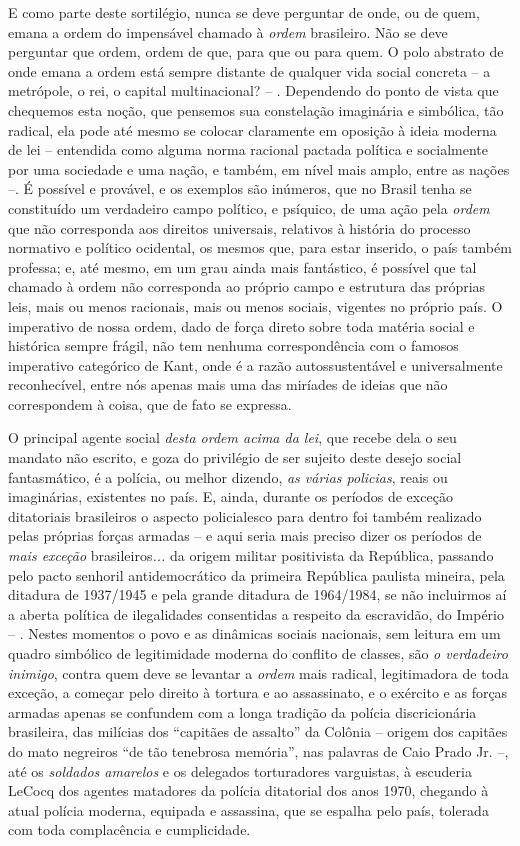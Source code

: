 E como parte deste sortilégio, nunca se deve perguntar de onde, ou de
quem, emana a ordem do impensável chamado à \emph{ordem} brasileiro. Não
se deve perguntar que ordem, ordem de que, para que ou para quem. O polo
abstrato de onde emana a ordem está sempre distante de qualquer vida
social concreta -- a metrópole, o rei, o capital multinacional? -- .
Dependendo do ponto de vista que chequemos esta noção, que pensemos sua
constelação imaginária e simbólica, tão radical, ela pode até mesmo se
colocar claramente em oposição à ideia moderna de lei -- entendida como
alguma norma racional pactada política e socialmente por uma sociedade e
uma nação, e também, em nível mais amplo, entre as nações --. É possível
e provável, e os exemplos são inúmeros, que no Brasil tenha se
constituído um verdadeiro campo político, e psíquico, de uma ação pela
\emph{ordem} que não corresponda aos direitos universais, relativos à
história do processo normativo e político ocidental, os mesmos que, para
estar inserido, o país também professa; e, até mesmo, em um grau ainda
mais fantástico, é possível que tal chamado à ordem não corresponda ao
próprio campo e estrutura das próprias leis, mais ou menos racionais,
mais ou menos sociais, vigentes no próprio país. O imperativo de nossa
ordem, dado de força direto sobre toda matéria social e histórica sempre
frágil, não tem nenhuma correspondência com o famosos imperativo
categórico de Kant, onde é a razão autossustentável e universalmente
reconhecível, entre nós apenas mais uma das miríades de ideias que não
correspondem à coisa, que de fato se expressa.

O principal agente social \emph{desta ordem acima da lei}, que recebe
dela o seu mandato não escrito, e goza do privilégio de ser sujeito
deste desejo social fantasmático, é a polícia, ou melhor dizendo,
\emph{as várias policias}, reais ou imaginárias, existentes no país. E,
ainda, durante os períodos de exceção ditatoriais brasileiros o aspecto
policialesco para dentro foi também realizado pelas próprias forças
armadas -- e aqui seria mais preciso dizer os períodos de \emph{mais
exceção} brasileiros\emph{...} da origem militar positivista da
República, passando pelo pacto senhoril antidemocrático da primeira
República paulista mineira, pela ditadura de 1937/1945 e pela grande
ditadura de 1964/1984, se não incluirmos aí a aberta política de
ilegalidades consentidas a respeito da escravidão, do Império -- .
Nestes momentos o povo e as dinâmicas sociais nacionais, sem leitura em
um quadro simbólico de legitimidade moderna do conflito de classes, são
\emph{o verdadeiro inimigo}, contra quem deve se levantar a \emph{ordem}
mais radical, legitimadora de toda exceção, a começar pelo direito à
tortura e ao assassinato, e o exército e as forças armadas apenas se
confundem com a longa tradição da polícia discricionária brasileira, das
milícias dos ``capitães de assalto'' da Colônia -- origem dos capitães
do mato negreiros ``de tão tenebrosa memória'', nas palavras de Caio
Prado Jr. --, até os \emph{soldados amarelos} e os delegados
torturadores varguistas, à escuderia LeCocq dos agentes matadores da
polícia ditatorial dos anos 1970, chegando à atual polícia moderna,
equipada e assassina, que se espalha pelo país, tolerada com toda
complacência e cumplicidade.

